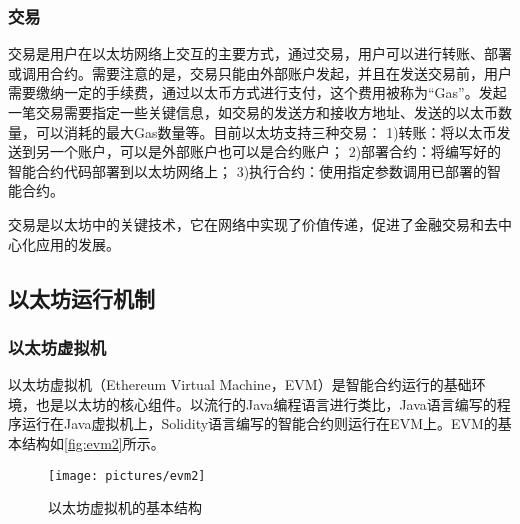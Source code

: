 \subsubsection{交易}
    
    交易是用户在以太坊网络上交互的主要方式，通过交易，用户可以进行转账、部署或调用合约。需要注意的是，交易只能由外部账户发起，并且在发送交易前，用户需要缴纳一定的手续费，通过以太币方式进行支付，这个费用被称为“Gas”。发起一笔交易需要指定一些关键信息，如交易的发送方和接收方地址、发送的以太币数量，可以消耗的最大Gas数量等。目前以太坊支持三种交易：
    1)转账：将以太币发送到另一个账户，可以是外部账户也可以是合约账户；
    2)部署合约：将编写好的智能合约代码部署到以太坊网络上；
    3)执行合约：使用指定参数调用已部署的智能合约。

    交易是以太坊中的关键技术，它在网络中实现了价值传递，促进了金融交易和去中心化应用的发展。
    


\subsection{以太坊运行机制}
\label{sec:以太坊运行机制}

\subsubsection{以太坊虚拟机}
    
    以太坊虚拟机（Ethereum Virtual Machine，EVM）是智能合约运行的基础环境，也是以太坊的核心组件。以流行的Java编程语言进行类比，Java语言编写的程序运行在Java虚拟机上，Solidity语言编写的智能合约则运行在EVM上。EVM的基本结构如\autoref{fig:evm2}所示。
        \begin{figure}[htbp]
            \centering
            \texttt{[image: pictures/evm2]}
            \caption{\label{fig:evm2}以太坊虚拟机的基本结构}
        \end{figure}

